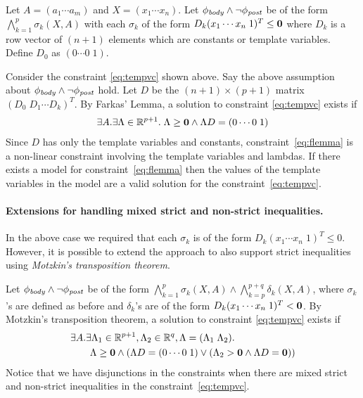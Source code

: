 \documentclass[a4paper,10pt]{article}
\begin{document}
Let $A = (a_1 \cdots a_m)$ and $X = (x_1 \cdots x_n)$.
Let $\mathit{\phi_{body}} \wedge \neg \mathit{\phi_{post}}$ be of the form 
$\bigwedge \limits_{k=1}^{p} \sigma_k(X,A)$ with each $\sigma_k$ of the form 
$D_k (x_1 \cdots x_n \; 1)^T \le \mathbf{0}$ where $D_k$ is a row vector of $(n+1)$ elements
which are constants or template variables.
Define $D_0$ as $(0 \cdots 0 \; 1)$.

Consider the constraint \ref{eq:tempvc} shown above. Say the above assumption about $\mathit{\phi_{body}} \wedge \neg \mathit{\phi_{post}}$ hold. 
Let $D$ be the $(n+1) \times (p+1)$ matrix $(D_0 \; D_1 \cdots D_k)^T$.
By Farkas' Lemma, a solution to constraint \ref{eq:tempvc} exists if
%
\begin{align}
\exists A. \exists \Lambda \in \mathbb{R}^{p+1}. \; \Lambda \ge \mathbf{0} \wedge \Lambda D =(0 \cdots 0 \; 1) \label{eq:flemma}
\end{align}
%
Since $D$ has only the template variables and constants, constraint~\ref{eq:flemma} is a non-linear constraint involving the template variables and lambdas. If there exists a model for constraint~\ref{eq:flemma} then the values of the template variables in the model 
are a valid solution for the constraint~\ref{eq:tempvc}.

\paragraph{Extensions for handling mixed strict and non-strict inequalities.}

In the above case we required that each $\sigma_k$ is of the form 
$D_k (x_1 \cdots x_n \; 1)^T \le 0$. However, it is possible to extend the approach to
also support strict inequalities using \emph{Motzkin's transposition theorem}.

Let $\mathit{\phi_{body}} \wedge \neg \mathit{\phi_{post}}$ be of the form 
$\bigwedge \limits_{k=1}^{p} \sigma_k(X,A) \wedge \bigwedge \limits_{k=p}^{p+q} \delta_k(X,A)$,
where $\sigma_k$'s are defined as before and $\delta_k$'s are of the form 
$D_k (x_1 \cdots x_n \; 1)^T < \mathbf{0}$.
By Motzkin's transposition theorem, a solution to constraint \ref{eq:tempvc} exists if
%
\begin{align}
& \nonumber
\exists A. \exists \Lambda_1 \in \mathbb{R}^{p+1}, \Lambda_2 \in \mathbb{R}^{q}, \Lambda = (\Lambda_1 \; \Lambda_2). \; \\ 
& \qquad \Lambda \ge \mathbf{0} \wedge (\Lambda D =(0 \cdots 0 \; 1) \vee (\Lambda_2 > \mathbf{0} \wedge \Lambda D = \mathbf{0})) \label{eq:motlemma}
\end{align}
%
Notice that we have disjunctions in the constraints when there are mixed strict and non-strict inequalities in the constraint~\ref{eq:tempvc}. 
\end{document}
